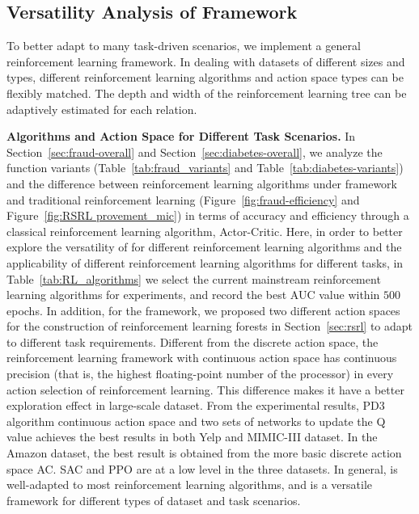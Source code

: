 \subsection{Versatility Analysis of \RSRL Framework}\label{sec:versatility}
To better adapt to many task-driven scenarios, we implement a general \RSRL reinforcement learning framework. 
In dealing with datasets of different sizes and types, different reinforcement learning algorithms and action space types can be flexibly matched. 
The depth and width of the reinforcement learning tree can be adaptively estimated for each relation. 


\textbf{Algorithms and Action Space for Different Task Scenarios. }
In Section~\ref{sec:fraud-overall} and Section~\ref{sec:diabetes-overall}, we analyze the function variants (Table~\ref{tab:fraud_variants} and Table~\ref{tab:diabetes-variants}) and the difference between reinforcement learning algorithms under \RSRL framework and traditional reinforcement learning (Figure~\ref{fig:fraud-efficiency} and Figure~\ref{fig:RSRL provement_mic}) in terms of accuracy and efficiency through a classical reinforcement learning algorithm, Actor-Critic.
Here, in order to better explore the versatility of \RioGNN for different reinforcement learning algorithms and the applicability of different reinforcement learning algorithms for different tasks, in Table~\ref{tab:RL_algorithms} we select the current mainstream reinforcement learning algorithms for experiments, and record the best AUC value within $500$ epochs. 
In addition, for the \RSRL framework, we proposed two different action spaces for the construction of reinforcement learning forests in Section~\ref{sec:rsrl} to adapt to different task requirements.
Different from the discrete action space, the reinforcement learning framework with continuous action space has continuous precision (that is, the highest floating-point number of the processor) in every action selection of reinforcement learning. 
This difference makes it have a better exploration effect in large-scale dataset.
From the experimental results, PD3 algorithm continuous action space and two sets of networks to update the Q value achieves the best results in both Yelp and MIMIC-III dataset. 
In the Amazon dataset, the best result is obtained from the more basic discrete action space AC. SAC and PPO are at a low level in the three datasets. 
In general, \RioGNN is well-adapted to most reinforcement learning algorithms, and is a versatile framework for different types of dataset and task scenarios.




